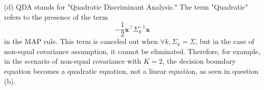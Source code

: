 (d) QDA stands for "Quadratic Discriminant Analysis." The term "Quadratic" refers to the presence of the term 
\[
- \frac{1}{2} \mathbf{x}^\intercal \Sigma_k^{-1} \mathbf{x}
\]
in the MAP rule. This term is canceled out when $\forall k, \Sigma_k = \Sigma$, but in the case of non-equal covariance assumption, it cannot be eliminated. Therefore, for example, in the scenario of non-equal covariance with $K=2$, the decision boundary equation becomes a quadratic equation, not a linear equation, as seen in question (b).

